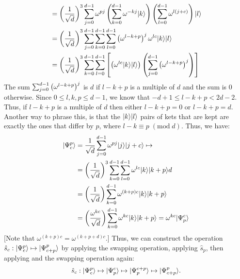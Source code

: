 \begin{enumerate}
\begin{equation}
\begin{split}
                     &= \left(\frac{1}{\sqrt{d}}\right)^3 \sum_{j=0}^{d-1} \omega^{pj}  \left(\sum_{k=0}^{d-1} \omega^{-kj} | k \rangle\right) \left(\sum_{l=0}^{d-1} \omega^{l(j+c)}\right) | l \rangle \\
                     &= \left(\frac{1}{\sqrt{d}}\right)^3 \sum_{j=0}^{d-1}  \sum_{k=0}^{d-1} \sum_{l=0}^{d-1} \left(\omega^{l - k + p}\right)^j \omega^{lc} | k \rangle | l \rangle  \\
                     &= \left(\frac{1}{\sqrt{d}}\right)^3  \sum_{k=0}^{d-1} \sum_{l=0}^{d-1} \left[ \left(\omega^{lc} | k \rangle | l \rangle\right)\left( \sum_{j=0}^{d-1}\left(\omega^{l - k + p}\right)^j \right)\right] \\
    \end{split}
  \end{equation}
The sum $\sum_{j=0}^{d-1}\left(\omega^{l - k + p}\right)^j$ is $d$ if $l - k + p$ is a multiple of $d$ and the sum is $0$ otherwise. Since $0 \leq l, k, p \leq d-1$, we know that $-d + 1 \leq l - k + p < 2d - 2$. Thus, if $l - k + p$ is a multiple of $d$ then either $l - k + p = 0$ or $l - k + p = d$. Another way to phrase this, is that the $| k \rangle | l \rangle$ pairs of kets that are kept are exactly the ones that differ by $p$, where $l - k \equiv p \;(\text{mod}\; d)$. Thus, we have:
    \begin{equation}
    \begin{split}
      | \Psi_c^p \rangle &= \frac{1}{\sqrt{d}}\sum_{j=0}^{d-1} \omega^{pj} | j \rangle | j+c \rangle \mapsto \\
                     &= \left(\frac{1}{\sqrt{d}}\right)^3  \sum_{k=0}^{d-1} \sum_{l=0}^{d-1} \omega^{lc} | k \rangle | k + p \rangle d\\
                     &= \left(\frac{1}{\sqrt{d}}\right)  \sum_{k=0}^{d-1} \omega^{(k + p)c} | k \rangle | k + p \rangle\\
                     &= \left(\frac{\omega^{kc}}{\sqrt{d}}\right)  \sum_{k=0}^{d-1} \omega^{kc} | k \rangle | k + p \rangle = \omega^{kc} | \Psi_p^c \rangle \\
    \end{split}
  \end{equation}
  [Note that $\omega^{(k + p)c} = \omega^{(k + p + d)c}$.]
  Thus, we can construct the operation $\hat{s}_c: | \Psi_c^p \rangle \mapsto | \Psi_{c+p}^{p} \rangle$ by applying the swapping operation, applying $\hat{s}_p$, then applying and the swapping operation again:
  \begin{equation}
    \hat{s}_c: | \Psi_c^p \rangle \mapsto | \Psi_{p}^{c} \rangle \mapsto | \Psi_{p}^{c + p} \rangle \mapsto | \Psi_{c + p}^{p} \rangle.
  \end{equation}
\end{enumerate}
